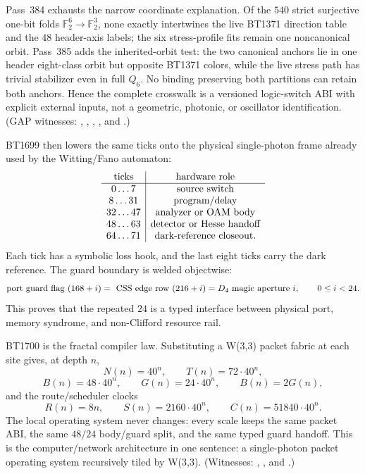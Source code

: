 \documentclass[11pt]{article}
\begin{document}
Pass~384 exhausts the narrow coordinate explanation.  Of the $540$ strict
surjective one-bit folds $\mathbb F_2^6\to\mathbb F_2^3$, none exactly
intertwines the live BT1371 direction table and the $48$ header-axis labels;
the six stress-profile fits remain one noncanonical orbit.  Pass~385 adds the
inherited-orbit test: the two canonical anchors lie in one header eight-class
orbit but opposite BT1371 colors, while the live stress path has trivial
stabilizer even in full $Q_6$.  No binding preserving both partitions can
retain both anchors.  Hence the complete crosswalk is a versioned logic-switch
ABI with explicit external inputs, not a geometric, photonic, or oscillator
identification.  (GAP witnesses:
,
,
,
, and
.)

BT1699 then lowers the same ticks onto the physical single-photon frame already
used by the Witting/Fano automaton:
\[
\begin{array}{c|c}
\hbox{ticks} & \hbox{hardware role}\\
\hline
0\ldots7 & \hbox{source switch}\\
8\ldots31 & \hbox{program/delay}\\
32\ldots47 & \hbox{analyzer or OAM body}\\
48\ldots63 & \hbox{detector or Hesse handoff}\\
64\ldots71 & \hbox{dark-reference closeout}.
\end{array}
\]
Each tick has a symbolic loss hook, and the last eight ticks carry the dark
reference.  The guard boundary is welded objectwise:
\[
  \hbox{port guard flag }(168+i)
  =\hbox{ CSS edge row }(216+i)
  =\hbox{\(D_4\) magic aperture }i,\qquad 0\le i<24.
\]
This proves that the repeated \(24\) is a typed interface between physical
port, memory syndrome, and non-Clifford resource rail.

BT1700 is the fractal compiler law.  Substituting a W(3,3) packet fabric at each
site gives, at depth \(n\),
\[
  N(n)=40^n,\qquad T(n)=72\cdot40^n,
\]
\[
  B(n)=48\cdot40^n,\qquad G(n)=24\cdot40^n,\qquad B(n)=2G(n),
\]
and the route/scheduler clocks
\[
  R(n)=8n,\qquad S(n)=2160\cdot40^n,\qquad
  C(n)=51840\cdot40^n.
\]
The local operating system never changes: every scale keeps the same packet
ABI, the same \(48/24\) body/guard split, and the same typed guard handoff.
This is the computer/network architecture in one sentence: a single-photon
packet operating system recursively tiled by W(3,3).  (Witnesses:
,
, and
.)
\end{document}
